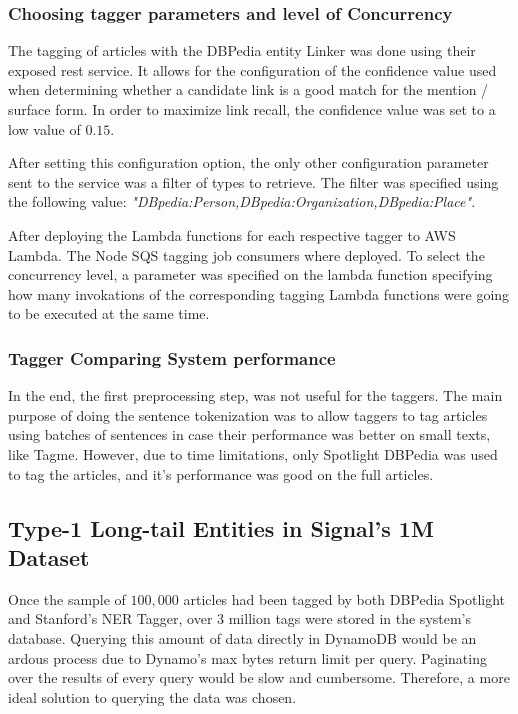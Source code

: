 \subsubsection{Choosing tagger parameters and level of Concurrency}
The tagging of articles with the DBPedia entity Linker was done using their exposed rest service.
It allows for the configuration of the confidence value used when determining whether a candidate link is a good match for the 
mention / surface form. 
In order to maximize link recall, the confidence value was set to a low value of $0.15$.

After setting this configuration option, the only other configuration parameter sent to the service was a filter of types to
retrieve. The filter was specified using the following value: \textit{"DBpedia:Person,DBpedia:Organization,DBpedia:Place"}.

After deploying the Lambda functions for each respective tagger to AWS Lambda.
The Node SQS tagging job consumers where deployed.
To select the concurrency level, a parameter was specified on the lambda function specifying how many invokations of the 
corresponding tagging Lambda functions were going to be executed at the same time.

\subsubsection{Tagger Comparing System performance}
In the end, the first preprocessing step, was not useful for the taggers.
The main purpose of doing the sentence tokenization was to allow taggers to tag articles using batches of sentences
in case their performance was better on small texts, like Tagme\cite{tagme}.
However, due to time limitations, only Spotlight DBPedia was used to tag the articles, and it's performance was good
on the full articles. 

\subsection{Type-1 Long-tail Entities in Signal's 1M Dataset} \label{ResultsSignal}
Once the sample of $100,000$ articles had been tagged by both DBPedia Spotlight and Stanford's NER Tagger,
over 3 million tags were stored in the system's database.
Querying this amount of data directly in DynamoDB would be an ardous process due to Dynamo's max bytes return limit per query.
Paginating over the results of every query would be slow and cumbersome.
Therefore, a more ideal solution to querying the data was chosen.


